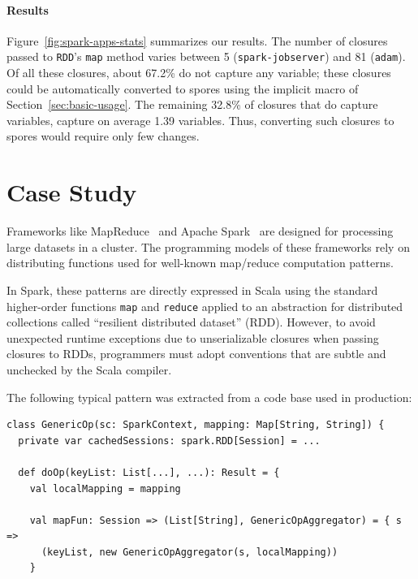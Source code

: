\documentclass[runningheads]{llncs}
\begin{document}
\begin{sloppypar}
\paragraph{\textbf{Results}} Figure~\ref{fig:spark-apps-stats} summarizes our
results. The number of closures passed to \verb|RDD|'s \verb|map| method
varies between 5 (\verb|spark-jobserver|) and 81 (\verb|adam|). Of all these
closures, about 67.2\% do not capture any variable; these closures could be
automatically converted to spores using the implicit macro of
Section~\ref{sec:basic-usage}. The remaining 32.8\% of closures that do capture variables,
capture on average 1.39 variables. Thus, converting such closures to spores
would require only few changes.

\section{Case Study}
\label{sec:case-studies}


Frameworks like MapReduce~\cite{MapReduce} and Apache Spark~\cite{Spark} are designed for processing large datasets in a cluster. The programming models of these frameworks rely on distributing functions used for well-known map/reduce computation patterns.

In Spark, these patterns are directly expressed in Scala using the standard higher-order functions \verb|map| and \verb|reduce| applied to an abstraction for distributed collections called ``resilient distributed dataset'' (RDD). However, to avoid unexpected runtime exceptions due to unserializable closures when passing closures to RDDs, programmers must adopt conventions that are subtle and unchecked by the Scala compiler.

The following typical pattern was extracted from a code base used in production:

\begin{lstlisting}
class GenericOp(sc: SparkContext, mapping: Map[String, String]) {
  private var cachedSessions: spark.RDD[Session] = ...

  def doOp(keyList: List[...], ...): Result = {
    val localMapping = mapping

    val mapFun: Session => (List[String], GenericOpAggregator) = { s =>
      (keyList, new GenericOpAggregator(s, localMapping))
    }


\end{lstlisting}
\end{sloppypar}
\end{document}
